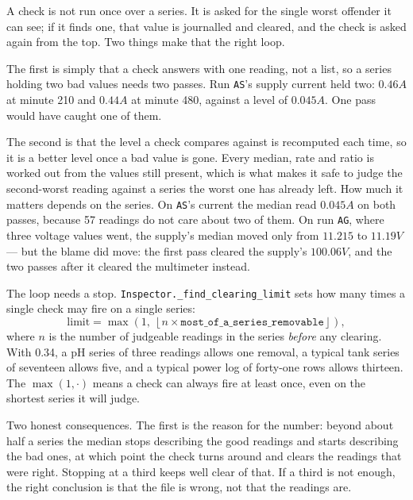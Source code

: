 A check is not run once over a series. It is asked for the single worst offender it can see;
if it finds one, that value is journalled and cleared, and the check is asked again from the
top. Two things make that the right loop.

The first is simply that a check answers with one reading, not a list, so a series holding two
bad values needs two passes. Run \texttt{AS}'s supply current held two: $0.46\unit{A}$ at
minute 210 and $0.44\unit{A}$ at minute 480, against a level of $0.045\unit{A}$. One pass would
have caught one of them.

The second is that the level a check compares against is recomputed each time, so it is a
better level once a bad value is gone. Every median, rate and ratio is worked out from the
values still present, which is what makes it safe to judge the second-worst reading against a
series the worst one has already left. How much it matters depends on the series. On
\texttt{AS}'s current the median read $0.045\unit{A}$ on both passes, because 57 readings do
not care about two of them. On run \texttt{AG}, where three voltage values went, the supply's
median moved only from $11.215$ to $11.19\unit{V}$ --- but the blame did move: the first pass
cleared the supply's $100.06\unit{V}$, and the two passes after it cleared the multimeter
instead.

The loop needs a stop. \texttt{Inspector.\_find\_clearing\_limit} sets how many times a single
check may fire on a single series:
\begin{equation}
  \label{eq:clearing-limit}
  \text{limit} = \max\!\left(1,\ \left\lfloor
    n \times \texttt{most\_of\_a\_series\_removable} \right\rfloor \right),
\end{equation}
where $n$ is the number of judgeable readings in the series \emph{before} any clearing. With
0.34, a pH series of three readings allows one removal, a typical tank series of seventeen
allows five, and a typical power log of forty-one rows allows thirteen. The $\max(1, \cdot)$
means a check can always fire at least once, even on the shortest series it will judge.

Two honest consequences. The first is the reason for the number: beyond about half a series the
median stops describing the good readings and starts describing the bad ones, at which point
the check turns around and clears the readings that were right. Stopping at a third keeps well
clear of that. If a third is not enough, the right conclusion is that the file is wrong, not
that the readings are.

